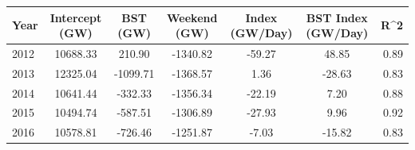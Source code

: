 \begin{tabular}{lcccccr}
\toprule
Year & Intercept (GW) & BST (GW) & Weekend (GW) & Index (GW/Day) & BST Index (GW/Day) & R\textasciicircum 2 \\
\midrule
2012 & 10688.33 & 210.90 & -1340.82 & -59.27 & 48.85 & 0.89 \\
2013 & 12325.04 & -1099.71 & -1368.57 & 1.36 & -28.63 & 0.83 \\
2014 & 10641.44 & -332.33 & -1356.34 & -22.19 & 7.20 & 0.88 \\
2015 & 10494.74 & -587.51 & -1306.89 & -27.93 & 9.96 & 0.92 \\
2016 & 10578.81 & -726.46 & -1251.87 & -7.03 & -15.82 & 0.83 \\
\bottomrule
\end{tabular}
